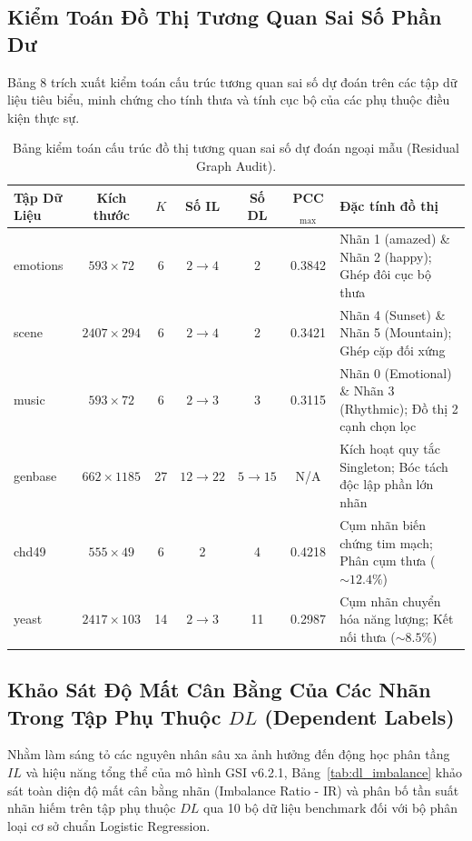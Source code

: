 \documentclass[10pt,a4paper,twoside]{article}
\begin{document}
\subsection{Kiểm Toán Đồ Thị Tương Quan Sai Số Phần Dư}
Bảng 8 trích xuất kiểm toán cấu trúc tương quan sai số dự đoán trên các tập dữ liệu tiêu biểu, minh chứng cho tính thưa và tính cục bộ của các phụ thuộc điều kiện thực sự.

\begin{table}[H]
\centering
\small
\caption{Bảng kiểm toán cấu trúc đồ thị tương quan sai số dự đoán ngoại mẫu (Residual Graph Audit).}
\label{tab:graph_audit}
\vspace{0.4em}
\begin{tabular}{lcccccp{4.2cm}}
\toprule
\textbf{Tập Dữ Liệu} & \textbf{Kích thước} & \textbf{$K$} & \textbf{Số IL} & \textbf{Số DL} & \textbf{PCC}$_{\max}$ & \textbf{Đặc tính đồ thị} \\
\midrule
emotions & $593 \times 72$ & 6 & $2 \to 4$ & 2 & 0.3842 & Nhãn 1 (amazed) \& Nhãn 2 (happy); Ghép đôi cục bộ thưa \\
scene    & $2407 \times 294$ & 6 & $2 \to 4$ & 2 & 0.3421 & Nhãn 4 (Sunset) \& Nhãn 5 (Mountain); Ghép cặp đối xứng \\
music    & $593 \times 72$ & 6 & $2 \to 3$ & 3 & 0.3115 & Nhãn 0 (Emotional) \& Nhãn 3 (Rhythmic); Đồ thị 2 cạnh chọn lọc \\
genbase  & $662 \times 1185$ & 27 & $12 \to 22$ & $5 \to 15$ & N/A & Kích hoạt quy tắc Singleton; Bóc tách độc lập phần lớn nhãn \\
chd49    & $555 \times 49$ & 6 & 2 & 4 & 0.4218 & Cụm nhãn biến chứng tim mạch; Phân cụm thưa ($\sim 12.4\%$) \\
yeast    & $2417 \times 103$ & 14 & $2 \to 3$ & 11 & 0.2987 & Cụm nhãn chuyển hóa năng lượng; Kết nối thưa ($\sim 8.5\%$) \\
\bottomrule
\end{tabular}
\end{table}

\subsection{Khảo Sát Độ Mất Cân Bằng Của Các Nhãn Trong Tập Phụ Thuộc $DL$ (Dependent Labels)}
Nhằm làm sáng tỏ các nguyên nhân sâu xa ảnh hưởng đến động học phân tầng $IL$ và hiệu năng tổng thể của mô hình GSI v6.2.1, Bảng~\ref{tab:dl_imbalance} khảo sát toàn diện độ mất cân bằng nhãn (Imbalance Ratio - IR) và phân bố tần suất nhãn hiếm trên tập phụ thuộc $DL$ qua 10 bộ dữ liệu benchmark đối với bộ phân loại cơ sở chuẩn Logistic Regression.
\end{document}
